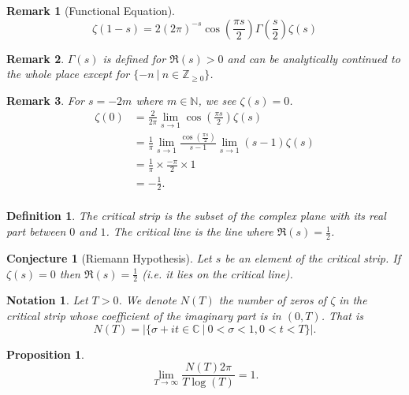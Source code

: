 \documentclass{article}
\newtheorem{proposition}{Proposition}[section]
\newtheorem{definition}{Definition}[section]
\newtheorem{notation}{Notation}[section]
\newtheorem{remark}{Remark}[section]
\newtheorem{conjecture}{Conjecture}[section]
\newcommand{\N}[0]{\mathbb{N}}
\newcommand{\Z}[0]{\mathbb{Z}}
\newcommand{\C}[0]{\mathbb{C}}
\newcommand{\sep}[0]{\:|\:}
\begin{document}
\begin{remark}[Functional Equation]
\begin{equation*}
\zeta(1-s) = 2(2\pi)^{-s}\cos\left({\frac {\pi s} 2}\right) \Gamma\left({\frac s 2}\right)\zeta(s)
\end{equation*}
\end{remark}

\begin{remark}
$\Gamma(s)$ is defined for $\Re(s)>0$ and can be analytically continued to the whole place except for $\{-n\:|\: n\in\Z_{\geq0}\}$. 
\end{remark}

\begin{remark}
For $s=-2m$ where $m\in \N$, we see $\zeta(s) = 0$. 
\begin{align*}
\zeta(0) &= {\frac 2 {2\pi}}\lim_{s\to 1}\cos\left({\frac {\pi s} 2}\right)\zeta(s) \\
&={\frac 1 \pi}\lim_{s\to 1}{\frac {\cos({\frac {\pi s} 2})} {s-1}}\lim_{s\to 1}(s-1)\zeta(s) \\
&= {\frac 1 \pi}\times {\frac {-\pi} 2}\times 1 \\
& = -{\frac 1 2}.\\
\end{align*}
\end{remark}

\begin{definition}
The critical strip is the subset of the complex plane with its real part between $0$ and $1$. The critical line is the line where $\Re(s) = {\frac 1 2}$.
\end{definition}

\begin{conjecture}[Riemann Hypothesis]
Let $s$ be an element of the critical strip. If $\zeta(s) = 0$ then $\Re(s)={\frac 1 2}$ (i.e. it lies on the critical line).
\end{conjecture}

\begin{notation}
Let $T>0$. We denote $N(T)$ the number of zeros of $\zeta$ in the critical strip whose coefficient of the imaginary part is in $(0,T)$. That is 
\begin{equation*}
  N(T) = \vert \{\sigma+it\in\C\sep 0<\sigma<1, 0<t<T\}\vert.
\end{equation*}
\end{notation}



\begin{proposition}
\begin{equation*}
\lim_{T\to\infty} {\frac {N(T)2\pi} {T\log(T)}} = 1.
\end{equation*}
\end{proposition}
\end{document}
